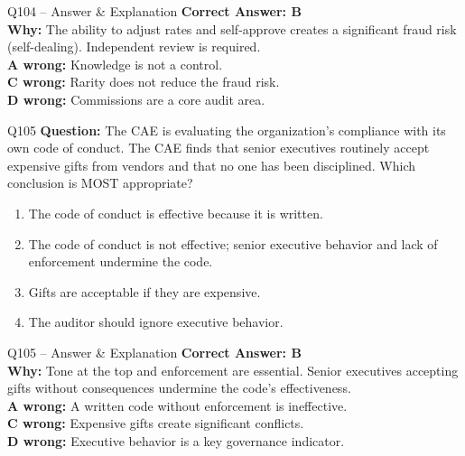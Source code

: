 \documentclass[aspectratio=169,10pt]{beamer}
\begin{document}
	\begin{frame}[t]{Q104 -- Answer \& Explanation}
		\small
		\textbf{Correct Answer: B} \\[4pt]
		\textbf{Why:} The ability to adjust rates and self-approve creates a significant fraud risk (self-dealing). Independent review is required. \\[4pt]
		\textbf{A wrong:} Knowledge is not a control. \\[2pt]
		\textbf{C wrong:} Rarity does not reduce the fraud risk. \\[2pt]
		\textbf{D wrong:} Commissions are a core audit area.
	\end{frame}
	
	\begin{frame}[t]{Q105}
		\small
		\textbf{Question:} The CAE is evaluating the organization's compliance with its own code of conduct. The CAE finds that senior executives routinely accept expensive gifts from vendors and that no one has been disciplined. Which conclusion is MOST appropriate?
		\begin{enumerate}[label=\Alph*.,itemsep=1pt,topsep=2pt]
			\item The code of conduct is effective because it is written.
			\item The code of conduct is not effective; senior executive behavior and lack of enforcement undermine the code.
			\item Gifts are acceptable if they are expensive.
			\item The auditor should ignore executive behavior.
		\end{enumerate}
	\end{frame}
	
	\begin{frame}[t]{Q105 -- Answer \& Explanation}
		\small
		\textbf{Correct Answer: B} \\[4pt]
		\textbf{Why:} Tone at the top and enforcement are essential. Senior executives accepting gifts without consequences undermine the code's effectiveness. \\[4pt]
		\textbf{A wrong:} A written code without enforcement is ineffective. \\[2pt]
		\textbf{C wrong:} Expensive gifts create significant conflicts. \\[2pt]
		\textbf{D wrong:} Executive behavior is a key governance indicator.
	\end{frame}
	
\end{document}
